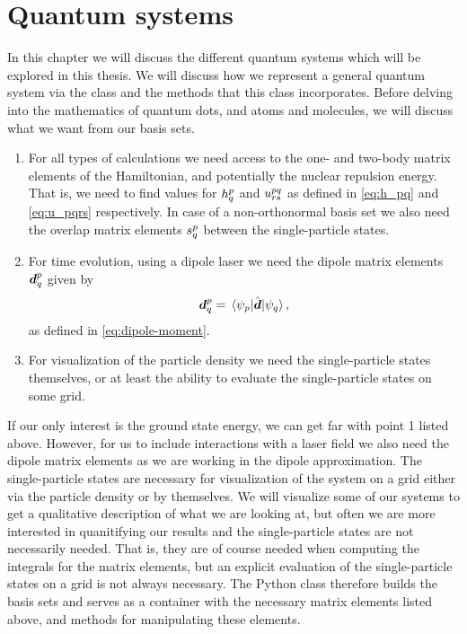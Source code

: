 \chapter{Quantum systems}
    In this chapter we will discuss the different quantum systems which will be
    explored in this thesis.
    We will discuss how we represent a general quantum system via the class
     and the methods that this class incorporates.
    Before delving into the mathematics of quantum dots, and atoms and
    molecules, we will discuss what we want from our basis sets.
    \begin{enumerate}
        \item For all types of calculations we need access to the one- and
            two-body matrix elements of the Hamiltonian, and potentially the
            nuclear repulsion energy.
            That is, we need to find values for $h^{p}_{q}$ and
            $u^{pq}_{rs}$ as defined in \autoref{eq:h_pq} and
            \autoref{eq:u_pqrs} respectively.
            In case of a non-orthonormal basis set we also need the overlap
            matrix elements $s^{p}_{q}$ between the single-particle
            states.
        \item For time evolution, using a dipole laser we need the dipole matrix
            elements $\boldsymbol{d}^{p}_{q}$ given by
            \begin{align}
                \boldsymbol{d}^{p}_{q}
                = \mel*{\psi_p}{\hat{\boldsymbol{d}}}{\psi_q},
            \end{align}
            as defined in \autoref{eq:dipole-moment}.
        \item For visualization of the particle density we need the
            single-particle states themselves, or at least the ability to
            evaluate the single-particle states on some grid.
    \end{enumerate}
    If our only interest is the ground state energy, we can get far with point 1
    listed above.
    However, for us to include interactions with a laser field we also need the
    dipole matrix elements as we are working in the dipole approximation.
    The single-particle states are necessary for visualization of the system on
    a grid either via the particle density or by themselves.
    We will visualize some of our systems to get a qualitative description of
    what we are looking at, but often we are more interested in quanitifying our
    results and the single-particle states are not necessarily needed.
    That is, they are of course needed when computing the integrals for the
    matrix elements, but an explicit evaluation of the single-particle states on
    a grid is not always necessary.
    The Python class  therefore builds the basis sets and
    serves as a container with the necessary matrix elements listed above, and
    methods for manipulating these elements.


